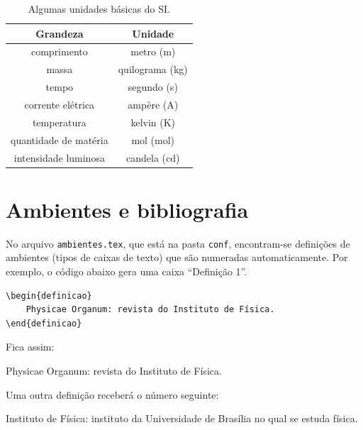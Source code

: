 \documentclass[12pt,a4paper,twoside]{article}
\begin{document}
\clearpage %

\begin{table}
    \centering
    \begin{minipage}{0.5\hsize}
    	\caption{Algumas unidades básicas do SI.}
	    \label{tab:SI-basicas}
	    \begin{tabular}{c|c}
		    \hline
		    \textbf{Grandeza} & \textbf{Unidade} \\
		    \hline
		    comprimento & metro (\si{\meter}) \\
		    \hline
		    massa & quilograma (\si{\kilo\gram}) \\
		    \hline
		    tempo & segundo (\si{\second}) \\
		    \hline
		    corrente elétrica & ampère (\si{\ampere}) \\
		    \hline
		    temperatura & kelvin (\si{\kelvin}) \\
		    \hline
		    quantidade de matéria & mol (\si{\mol}) \\
		    \hline
		    intensidade luminosa & candela (\si{\candela}) \\
		    \hline
	    \end{tabular}
    \end{minipage}
\end{table}

\section{Ambientes e bibliografia}

No arquivo \verb|ambientes.tex|, que está na pasta \verb|conf|, encontram-se definições de ambientes (tipos de caixas de texto) que são numeradas automaticamente. Por exemplo, o código abaixo gera uma caixa ``Definição 1''.
\begin{verbatim}
\begin{definicao}
    Physicae Organum: revista do Instituto de Física.
\end{definicao}
\end{verbatim}
Fica assim:
\begin{definicao}
    Physicae Organum: revista do Instituto de Física.
\end{definicao}
Uma outra definição receberá o número seguinte:
\begin{definicao}
    Instituto de Física: instituto da Universidade de Brasília no qual se estuda física.
\end{definicao}
\end{document}
